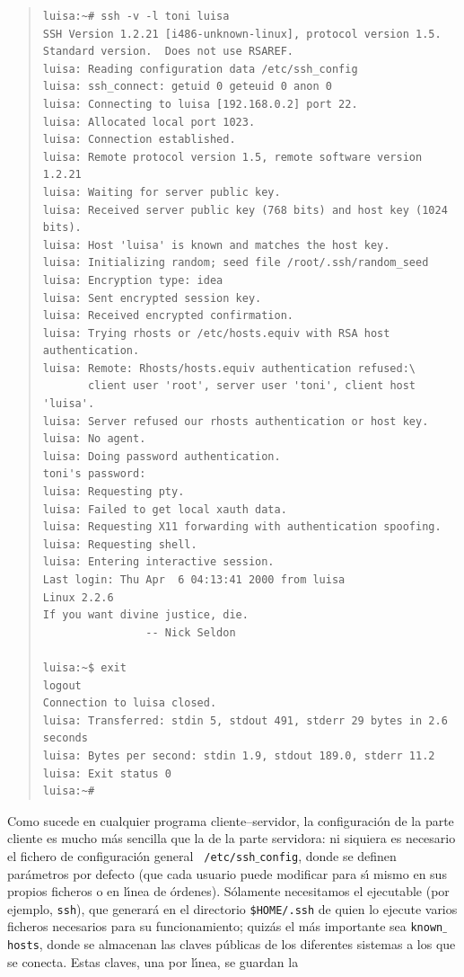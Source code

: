 \begin{quote}
\begin{verbatim}
luisa:~# ssh -v -l toni luisa
SSH Version 1.2.21 [i486-unknown-linux], protocol version 1.5.
Standard version.  Does not use RSAREF.
luisa: Reading configuration data /etc/ssh_config
luisa: ssh_connect: getuid 0 geteuid 0 anon 0
luisa: Connecting to luisa [192.168.0.2] port 22.
luisa: Allocated local port 1023.
luisa: Connection established.
luisa: Remote protocol version 1.5, remote software version 1.2.21
luisa: Waiting for server public key.
luisa: Received server public key (768 bits) and host key (1024 bits).
luisa: Host 'luisa' is known and matches the host key.
luisa: Initializing random; seed file /root/.ssh/random_seed
luisa: Encryption type: idea
luisa: Sent encrypted session key.
luisa: Received encrypted confirmation.
luisa: Trying rhosts or /etc/hosts.equiv with RSA host authentication.
luisa: Remote: Rhosts/hosts.equiv authentication refused:\
       client user 'root', server user 'toni', client host 'luisa'.
luisa: Server refused our rhosts authentication or host key.
luisa: No agent.
luisa: Doing password authentication.
toni's password:
luisa: Requesting pty.
luisa: Failed to get local xauth data.
luisa: Requesting X11 forwarding with authentication spoofing.
luisa: Requesting shell.
luisa: Entering interactive session.
Last login: Thu Apr  6 04:13:41 2000 from luisa
Linux 2.2.6
If you want divine justice, die.
                -- Nick Seldon

luisa:~$ exit
logout
Connection to luisa closed.
luisa: Transferred: stdin 5, stdout 491, stderr 29 bytes in 2.6 seconds
luisa: Bytes per second: stdin 1.9, stdout 189.0, stderr 11.2
luisa: Exit status 0
luisa:~# 
\end{verbatim}
\end{quote}
\normalsize
Como sucede en cualquier programa cliente--servidor, la configuraci\'on de la
parte cliente es mucho m\'as sencilla que la de la parte servidora: ni 
siquiera es necesario el fichero de configuraci\'on general {\tt 
/etc/ssh$\_$config}, donde se definen par\'ametros por defecto (que cada 
usuario puede modificar para s\'{\i} mismo en sus propios ficheros o en 
l\'{\i}nea de \'ordenes). S\'olamente necesitamos el ejecutable (por ejemplo, 
{\tt ssh}),
que generar\'a en el directorio {\tt \$HOME/.ssh} de quien lo ejecute varios
ficheros necesarios para su funcionamiento; quiz\'as el m\'as importante sea
{\tt known$\_$hosts}, donde se almacenan las claves p\'ublicas de los diferentes
sistemas a los que se conecta. Estas claves, una por l\'{\i}nea, se guardan la 
